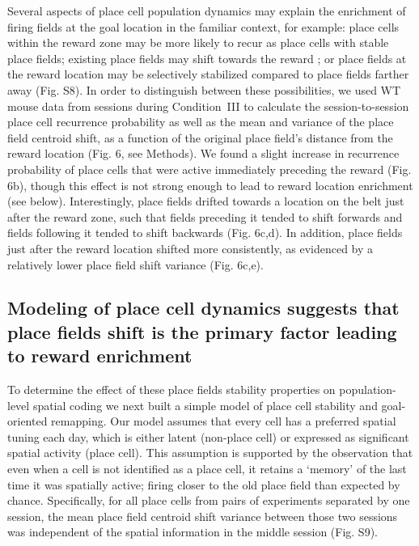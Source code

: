 Several aspects of place cell population dynamics may explain the enrichment of firing fields at the goal location in the familiar context, for example: place cells within the reward zone may be more likely to recur as place cells with stable place fields; existing place fields may shift towards the reward \citep{Lee2006a}; or place fields at the reward location may be selectively stabilized compared to place fields farther away (Fig. S8).  In order to distinguish between these possibilities, we used WT mouse data from sessions during Condition~III to calculate the session-to-session place cell recurrence probability as well as the mean and variance of the place field centroid shift, as a function of the original place field’s distance from the reward location (Fig. 6, see Methods).  We found a slight increase in recurrence probability of place cells that were active immediately preceding the reward (Fig. 6b), though this effect is not strong enough to lead to reward location enrichment (see below). Interestingly, place fields drifted towards a location on the belt just after the reward zone, such that fields preceding it tended to shift forwards and fields following it tended to shift backwards (Fig. 6c,d). In addition, place fields just after the reward location shifted more consistently, as evidenced by a relatively lower place field shift variance (Fig. 6c,e). 

\subsection{Modeling of place cell dynamics suggests that place fields shift is the primary factor leading to reward enrichment}

To determine the effect of these place fields stability properties on population-level spatial coding we next built a simple model of place cell stability and goal-oriented remapping. Our model assumes that every cell has a preferred spatial tuning each day, which is either latent (non-place cell) or expressed as significant spatial activity (place cell). This assumption is supported by the observation that even when a cell is not identified as a place cell, it retains a ‘memory’ of the last time it was spatially active; firing closer to the old place field than expected by chance. Specifically, for all place cells from pairs of experiments separated by one session, the mean place field centroid shift variance between those two sessions was independent of the spatial information in the middle session (Fig. S9).

